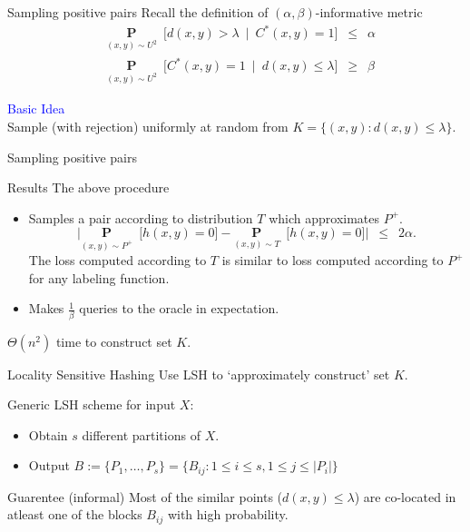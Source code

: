 \documentclass{beamer}
\newcommand{\mb}{\mathbf}
\begin{document}
\begin{frame}{Sampling positive pairs}
	Recall the definition of $(\alpha, \beta)$-informative metric
	\vspace{-10pt}\begin{align*}
		&\underset{(x, y) \sim U^2}{\mb P}\enspace \big[d(x, y) > \lambda \enspace|\enspace C^*(x, y) = 1\big] \enspace \le \enspace \alpha \\
		&\underset{(x, y) \sim U^2}{\mb P}\enspace \big[C^*(x, y) = 1 \enspace|\enspace d(x, y) \le \lambda \big] \enspace \ge \enspace \beta
	\end{align*}

    
	\vspace{20pt}\textcolor{blue}{Basic Idea}\\
	Sample (with rejection) uniformly at random from $K = \{(x, y): d(x, y) \le \lambda\}$. 
\end{frame}

\begin{frame}{Sampling positive pairs}

	\begin{block}{Results}
		The above procedure
		\begin{itemize}
			\item Samples a pair according to distribution $T$ which approximates $P^+$.
			$$\Big|\underset{(x, y) \sim P^+}{\mb P}\enspace \big[ h(x, y) = 0 ] - \underset{(x, y) \sim T}{\mb P}\enspace \big[ h(x, y) = 0 ]\Big|  \enspace \le \enspace 2\alpha.$$ 
			The loss computed according to $T$ is similar to loss computed according to $P^+$ for any labeling function.
			\item Makes $\frac{1}{\beta}$ queries to the oracle in expectation. 
		\end{itemize}			
	\end{block}
	\vspace{20pt}\alert{$\Theta(n^2)$} time to construct set $K$.		
\end{frame}

\begin{frame}{Locality Sensitive Hashing}
	Use LSH to `approximately construct' set $K$.
	
	\vspace{20pt}Generic LSH scheme for input $X$:
	\begin{itemize}
		\vspace{10pt}\item Obtain $s$ different partitions of $X$.
		\vspace{10pt}\item Output $ B := \{P_1, \ldots, P_s\} = \{B_{ij} : 1\le i\le s, 1\le j \le |P_i|\}$
	\end{itemize}
	
	\vspace{20pt} 
	\begin{block}{Guarentee (informal)} 
		Most of the similar points ($d(x, y) \le \lambda$) are co-located in atleast one of the blocks $B_{ij}$ with high probability. 
	\end{block}
\end{frame}
\end{document}
